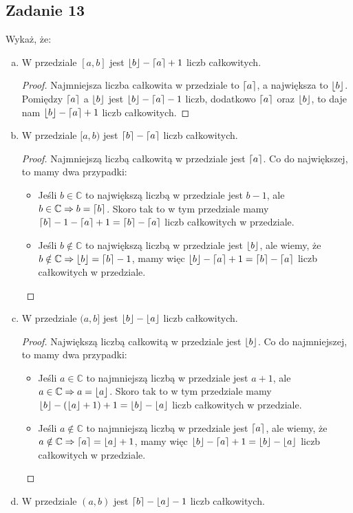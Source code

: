 \documentclass[a4paper]{article}
\DeclarePairedDelimiter\ceil{\lceil}{\rceil}
\DeclarePairedDelimiter\floor{\lfloor}{\rfloor}
\begin{document}
\subsection*{Zadanie 13}

Wykaż, że:

\begin{enumerate}[(a)]
\item W przedziale $[a,b]$ jest $\floor{b}-\ceil{a}+1$ liczb całkowitych.
\begin{proof}
Najmniejsza liczba całkowita w przedziale to $\ceil{a}$, a największa to $\floor{b}$.\\
Pomiędzy $\ceil{a}$ a $\floor{b}$ jest $\floor{b}-\ceil{a}-1$ liczb, dodatkowo $\ceil{a}$ oraz $\floor{b}$, to daje nam $\floor{b}-\ceil{a}+1$ liczb całkowitych.
\end{proof}

\item W przedziale $[a,b)$ jest $\ceil{b}-\ceil{a}$ liczb całkowitych.
\begin{proof}
Najmniejszą liczbą całkowitą w przedziale jest $\ceil{a}$.
Co do największej, to mamy dwa przypadki:
\begin{itemize}
\item Jeśli $b\in \mathbb{C}$ to największą liczbą w przedziale jest $b-1$, ale $b\in \mathbb{C} \Rightarrow b=\ceil{b}$. Skoro tak to w tym przedziale mamy $\ceil{b} - 1 - \ceil{a} + 1 = \ceil{b} - \ceil{a}$ liczb całkowitych w przedziale. 
\item Jeśli $b\notin \mathbb{C}$ to największą liczbą w przedziale jest $\floor{b}$, ale wiemy, że $b\notin \mathbb{C} \Rightarrow  \floor{b}=\ceil{b}-1$, mamy więc $\floor{b}-\ceil{a}+1=\ceil{b}-\ceil{a}$ liczb całkowitych w przedziale. 
\end{itemize}
\end{proof}


\item W przedziale $(a,b]$ jest $\floor{b}-\floor{a}$ liczb całkowitych.
\begin{proof}
Największą liczbą całkowitą w przedziale jest $\floor{b}$.
Co do najmniejszej, to mamy dwa przypadki:
\begin{itemize}
\item Jeśli $a\in \mathbb{C}$ to najmniejszą liczbą w przedziale jest $a+1$, ale $a\in \mathbb{C} \Rightarrow a=\floor{a}$. Skoro tak to w tym przedziale mamy $\floor{b} - (\floor{a} + 1) + 1 = \floor{b} - \floor{a}$ liczb całkowitych w przedziale. 
\item Jeśli $a\notin \mathbb{C}$ to najmniejszą liczbą w przedziale jest $\ceil{a}$, ale wiemy, że $a\notin \mathbb{C} \Rightarrow \ceil{a}=\floor{a}+1$, mamy więc $\floor{b}-\ceil{a}+1=\floor{b}-\floor{a}$ liczb całkowitych w przedziale. 
\end{itemize}
\end{proof}
\clearpage
\item W przedziale $(a,b)$ jest $\ceil{b}-\floor{a}-1$ liczb całkowitych.


\end{enumerate}
\end{document}
